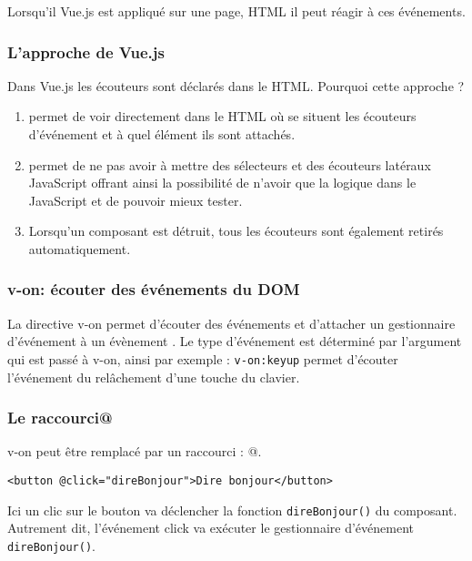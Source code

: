 Lorsqu'il {\color{monOrange}Vue.js} est appliqué sur une page, HTML il peut réagir à ces événements.

\subsubsection{L'approche de {\color{monOrange}Vue.js}}
Dans {\color{monOrange}Vue.js} les écouteurs sont déclarés dans le HTML. Pourquoi cette approche ?
\begin{enumerate}
\item  permet de voir directement dans le HTML où se situent les écouteurs d'événement et à quel élément ils sont attachés.
\item  permet de ne pas avoir à mettre des sélecteurs et des écouteurs latéraux JavaScript offrant ainsi la possibilité de n'avoir que la logique dans le JavaScript et de pouvoir mieux tester.
\item  Lorsqu'un composant est détruit, tous les écouteurs sont également retirés automatiquement.
\end{enumerate}

\subsubsection{{\color{monOrange}v-on}: écouter des événements du DOM}
La directive {\color{monOrange}v-on} permet d'écouter des événements et d'attacher un gestionnaire d'événement à un évènement . Le type d'événement est déterminé par l'argument qui est passé à {\color{monOrange}v-on}, ainsi par exemple : {\tt v-on:keyup} permet d'écouter l'événement du relâchement d'une touche du clavier.

\subsubsection{Le raccourci@}
{\color{monOrange}v-on} peut être remplacé par un raccourci : {\color{monOrange}@}.
\begin{verbatim}
<button @click="direBonjour">Dire bonjour</button>
\end{verbatim}

Ici un {\color{monOrange}clic} sur le bouton va déclencher la fonction {\tt direBonjour()} du composant. Autrement dit, l'événement {\color{monOrange}click} va exécuter le gestionnaire d'événement {\tt direBonjour()}.

